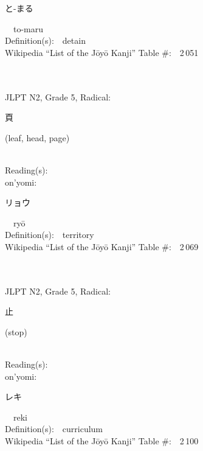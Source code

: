 \begin{multicols}{2}
{\hspace*{2em}}{\begin{CJK}{UTF8}{min} と-まる \end{CJK}}\ \ to-maru\ \ \\
Definition(s):\ \ detain \\
Wikipedia ``List of the J\=oy\=o Kanji'' Table \#:\ \ 2\,051 \\
\ \ \\
{\fontsize{34pt}{40pt}  }\ \ \\  %
{JLPT N2, Grade 5, Radical:\ \ {\begin{CJK}{UTF8}{min} 頁 \end{CJK}} (leaf, head, page) } \\
Reading(s):\ \ \\
{\hspace*{1em}}on'yomi:\ \ \\
{\hspace*{2em}}{\begin{CJK}{UTF8}{min} リョウ \end{CJK}}\ \ ry\=o\ \ \\
Definition(s):\ \ territory \\
Wikipedia ``List of the J\=oy\=o Kanji'' Table \#:\ \ 2\,069 \\
\ \ \\
{\fontsize{34pt}{40pt}  }\ \ \\  %
{JLPT N2, Grade 5, Radical:\ \ {\begin{CJK}{UTF8}{min} 止 \end{CJK}} (stop) } \\
Reading(s):\ \ \\
{\hspace*{1em}}on'yomi:\ \ \\
{\hspace*{2em}}{\begin{CJK}{UTF8}{min} レキ \end{CJK}}\ \ reki\ \ \\
Definition(s):\ \ curriculum \\
Wikipedia ``List of the J\=oy\=o Kanji'' Table \#:\ \ 2\,100 \\
\ \ \\
\end{multicols}

